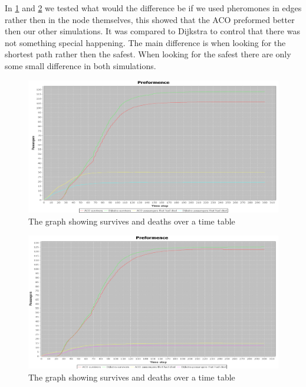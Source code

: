 In \ref{fig:celebShortPherInEdges} and \ref{fig:celebSafePherInEdges} we tested what would the difference be if we used pheromones in edges rather then in the node themselves, this showed that the ACO preformed better then our other simulations. It was compared to Dijkstra to control that there was not something special happening. The main difference is when looking for the shortest path rather then the safest. When looking for the safest there are only some small difference in both simulations.

\begin{figure} [h]
\centering
\hspace*{-5.5in}
\includegraphics[scale=0.35]{images/Graph using 200 rounds 140 passangers and shortest first one hazzard and ACO having pheremons in edges.png}
\caption{The graph showing survives and deaths over a time table}
\label{fig:celebShortPherInEdges}
\end{figure}

\begin{figure} [h]
\centering
\hspace*{-5.5in}
\includegraphics[scale=0.35]{images/Graph using 200 rounds 140 passangers and safest first one hazzard and ACO having pheremons in edges.png}
\caption{The graph showing survives and deaths over a time table}
\label{fig:celebSafePherInEdges}
\end{figure}